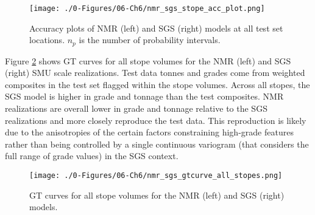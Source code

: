 \begin{figure}[htb!]
    \centering
    \texttt{[image: ./0-Figures/06-Ch6/nmr\_sgs\_stope\_acc\_plot.png]}
    \caption{Accuracy plots of  \gls{NMR} (left) and \gls{SGS} (right) models at all test set locations. $n_{p}$ is the number of probability intervals. }
    \label{fig:nmr_sgs_stope_acc_plot}
\end{figure}

Figure \ref{fig:nmr_sgs_gtcurve_all_stopes} shows \gls{GT} curves for all stope volumes for the \gls{NMR} (left) and \gls{SGS} (right) \gls{SMU} scale realizations. Test data tonnes and grades come from weighted composites in the test set flagged within the stope volumes. Across all stopes, the \gls{SGS} model is higher in grade and tonnage than the test composites. \gls{NMR} realizations are overall lower in grade and tonnage relative to the \gls{SGS} realizations and more closely reproduce the test data. This reproduction is likely due to the anisotropies of the certain factors constraining high-grade features rather than being controlled by a single continuous variogram (that considers the full range of grade values) in the \gls{SGS} context.

\begin{figure}[htb!]
    \centering
    \texttt{[image: ./0-Figures/06-Ch6/nmr\_sgs\_gtcurve\_all\_stopes.png]}
    \caption{\Gls{GT} curves for all stope volumes for the \gls{NMR} (left) and \gls{SGS} (right) models. }
    \label{fig:nmr_sgs_gtcurve_all_stopes}
\end{figure}

